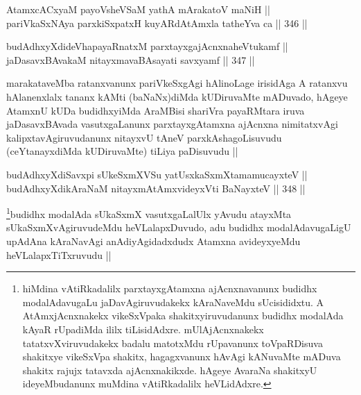 
\begin{shl}
AtamxcACxyaM payoV\s sheVSaM yathA mArakatoV maNiH || \\
pariVkaSxNAya parxkiSxpatxH kuyARdAtAmxla tatheYva ca ||  346 ||  
\end{shl}
				
\begin{shl}
budAdhxyXdideVhapayaRnatxM parxtayxgajAcnxnaheVtukamf || \\
jaDasavxBAvakaM nitayxmavaBAsayati savxyamf ||  347 ||  
\end{shl}

\begin{artha}
marakataveMba ratanxvanunx pariVkeSxgAgi hAlinoLage irisidAga A ratanxvu hAlanenxlalx tananx kAMti (baNaNx)diMda kUDiruvaMte mADuvado, hAgeye AtamxnU kUDa budidhxyiMda AraMBisi shariVra payaRMtara iruva jaDasavxBAvada vasutxgaLanunx parxtayxgAtamxna ajAcnxna nimitatxvAgi kalipxtavAgiruvudanunx nitayxvU tAneV parxkAshagoLisuvudu (ceYtanayxdiMda kUDiruvaMte) tiLiya paDisuvudu ||
\end{artha}


\begin{shl}
budAdhxyXdiSavxpi sUkeSxmXVSu yatUsxkaSxmXtamamucayxteV || \\
budAdhxyXdikAraNaM nitayxmAtAmxvideyxVti BaNayxteV ||  348 ||  
\end{shl}

\begin{artha}
\footnote{hiMdina vAtiRkadalilx parxtayxgAtamxna ajAcnxnavanunx budidhx modalAdavugaLu jaDavAgiruvudakekx kAraNaveMdu sUcisididxtu. A AtAmxjAcnxnakekx vikeSxVpaka shakitxyiruvudanunx budidhx modalAda kAyaR rUpadiMda ililx tiLisidAdxre. mUlAjAcnxnakekx tatatxvXviruvudakekx badalu matotxMdu rUpavanunx toVpaRDisuva shakitxye vikeSxVpa shakitx, hagagxvanunx hAvAgi kANuvaMte mADuva shakitx rajujx tatavxda ajAcnxnakikxde. hAgeye AvaraNa shakitxyU ideyeMbudanunx muMdina vAtiRkadalilx heVLidAdxre.}budidhx modalAda sUkaSxmX vasutxgaLalUlx yAvudu atayxMta sUkaSxmXvAgiruvudeMdu heVLalapxDuvudo, adu budidhx modalAdavugaLigU upAdAna kAraNavAgi anAdiyAgidadxdudx Atamxna avideyxyeMdu heVLalapxTiTxruvudu ||
\end{artha}


